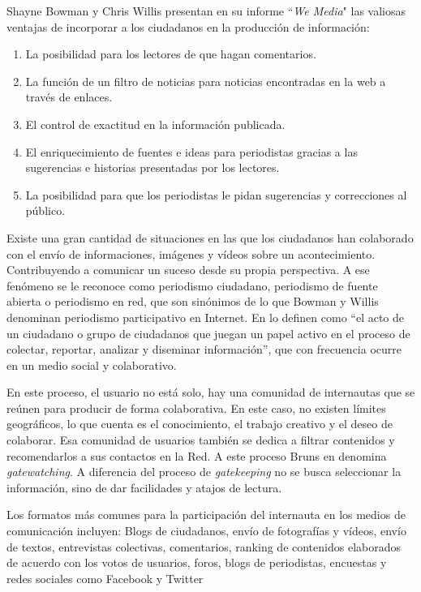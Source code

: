 Shayne Bowman y Chris Willis presentan en su informe ``\emph{We Media}" \cite{wethemedia} las valiosas ventajas de incorporar a los ciudadanos en la producción de información:
\begin{enumerate}
\item La posibilidad para los lectores de que hagan comentarios.
\item La función de un filtro de noticias para noticias encontradas en la web a través de enlaces.
\item El control de exactitud en la información publicada.
\item El enriquecimiento de fuentes e ideas para periodistas gracias a las sugerencias e historias presentadas por los lectores.
\item La posibilidad para que los periodistas le pidan sugerencias y correcciones al público.
\end{enumerate}

Existe una gran cantidad de situaciones en las que los ciudadanos han colaborado con el envío de informaciones, imágenes y vídeos sobre un acontecimiento. Contribuyendo a comunicar un suceso desde su propia perspectiva. 
A ese fenómeno se le reconoce como periodismo ciudadano, periodismo de fuente abierta o periodismo en red, que son sinónimos de lo que Bowman y Willis denominan periodismo participativo en Internet. En \cite{wethemedia} lo definen como “el acto de un ciudadano o grupo de ciudadanos que juegan un papel activo en el proceso de colectar, reportar, analizar y diseminar información”, que con frecuencia ocurre en un medio social y colaborativo. %

En este proceso, el usuario no está solo, hay una comunidad de internautas que se reúnen para producir de forma colaborativa. En este caso, no existen límites geográficos, lo que cuenta es el conocimiento, el trabajo creativo y el deseo de colaborar.
Esa comunidad de usuarios también se dedica a filtrar contenidos y recomendarlos a sus contactos en la Red. A este proceso Bruns en \cite{quteprints189} denomina \emph{gatewatching}. A diferencia del proceso de \emph{gatekeeping} no se busca seleccionar la información, sino de dar facilidades y atajos de lectura.

Los formatos más comunes para la participación del internauta en los medios de comunicación incluyen: Blogs de ciudadanos, envío de fotografías y vídeos, envío de textos, entrevistas colectivas, comentarios, ranking de contenidos elaborados de acuerdo con los votos de usuarios, foros, blogs de periodistas, encuestas y redes sociales como Facebook y Twitter \cite{doi17512781003640703} %


